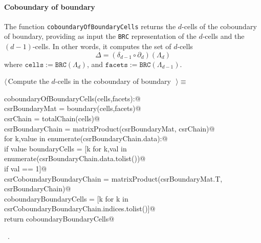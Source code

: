 \documentclass[11pt,oneside]{article}	%
\begin{document}
\paragraph{Coboundary of boundary}

The function \texttt{coboundaryOfBoundaryCells} returns the $d$-cells of the coboundary of boundary, providing as input the \texttt{BRC} representation of the $d$-cells and the $(d-1)$-cells. In other words, it computes the set of $d$-cells
\[
\Delta = (\delta_{d-1}\circ\partial_d)(\Lambda_d)
\]
where $\texttt{cells} := \texttt{BRC}(\Lambda_d)$, and $\texttt{facets} := \texttt{BRC}(\Lambda_{d-1})$.

\begin{flushleft} \small \label{scrap12}
$\langle\,$Compute the $d$-cells in the coboundary of boundary\nobreak\ {\footnotesize {}}$\,\rangle\equiv$
\vspace{-1ex}
\begin{list}{}{} \item
\mbox{}\verb@def coboundaryOfBoundaryCells(cells,facets):@\\
\mbox{}\verb@    csrBoundaryMat = boundary(cells,facets)@\\
\mbox{}\verb@    csrChain = totalChain(cells)@\\
\mbox{}\verb@    csrBoundaryChain = matrixProduct(csrBoundaryMat, csrChain)@\\
\mbox{}\verb@    for k,value in enumerate(csrBoundaryChain.data):@\\
\mbox{}\verb@        if value % 2 == 0: csrBoundaryChain.data[k] = 0@\\
\mbox{}\verb@    boundaryCells = [k for k,val in enumerate(csrBoundaryChain.data.tolist())@\\
\mbox{}\verb@                               if val == 1]@\\
\mbox{}\verb@    csrCoboundaryBoundaryChain = matrixProduct(csrBoundaryMat.T, csrBoundaryChain)@\\
\mbox{}\verb@    coboundaryBoundaryCells = [k for k in csrCoboundaryBoundaryChain.indices.tolist()]@\\
\mbox{}\verb@    return coboundaryBoundaryCells@\\
\mbox{}\verb@@{\NWsep}
\end{list}
\vspace{-1ex}
\footnotesize\addtolength{\baselineskip}{-1ex}
\begin{list}{}{\setlength{\itemsep}{-\parsep}\setlength{\itemindent}{-\leftmargin}}
\item \NWtxtMacroRefIn\ .
\end{list}
\end{flushleft}
\end{document}
